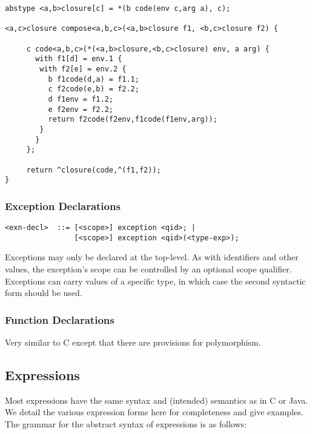 \documentclass[titlepage,10pt]{article}
\begin{document}
\begin{verbatim}
abstype <a,b>closure[c] = *(b code(env c,arg a), c);

<a,c>closure compose<a,b,c>(<a,b>closure f1, <b,c>closure f2) {

     c code<a,b,c>(*(<a,b>closure,<b,c>closure) env, a arg) {
       with f1[d] = env.1 { 
        with f2[e] = env.2 {
          b f1code(d,a) = f1.1;
          c f2code(e,b) = f2.2;
          d f1env = f1.2;
          e f2env = f2.2;
          return f2code(f2env,f1code(f1env,arg));
        }
       }
     };

     return ^closure(code,^(f1,f2));
}
\end{verbatim}


\subsubsection{Exception Declarations}


\begin{verbatim}
<exn-decl>  ::= [<scope>] exception <qid>; | 
                [<scope>] exception <qid>(<type-exp>);
\end{verbatim}

Exceptions may only be declared at the top-level.  As with identifiers
and other values, the exception's scope can be controlled by an optional
scope qualifier.  Exceptions can carry values of a specific type, in
which case the second syntactic form should be used.

\subsubsection{Function Declarations}

Very similar to C except that there are provisions for polymorphism.


\subsection{Expressions\label{expressions}}

Most expressions have the same syntax and (intended) semantics as in C
or Java.  We detail the various expression forms here for completeness
and give examples.  The grammar for the abstract syntax of expressions
is as follows:
\end{document}
